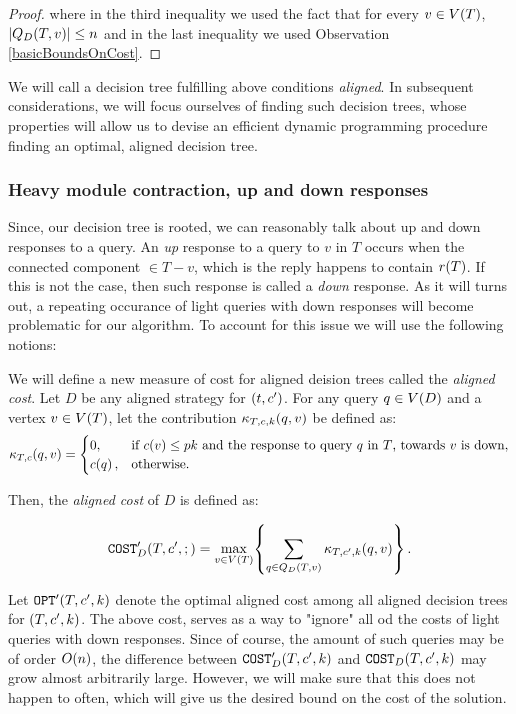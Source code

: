 \begin{lemma}
\begin{proof}
        where in the third inequality we used the fact that for every $v\in V\mathopen{}\left( T \right)$, $\mathopen{}\left| Q_{D}\mathopen{}\left( T,v \right) \right|\leq n$ and in the last inequality we used Observation \ref{basicBoundsOnCost}.
    \end{proof}
\end{lemma}

We will call a decision tree fulfilling above conditions \textit{aligned}. In subsequent considerations, we will focus ourselves of finding such decision trees, whose properties will allow us to devise an efficient dynamic programming procedure finding an optimal, aligned decision tree. 

\subsubsection{Heavy module contraction, up and down responses}
Since, our decision tree is rooted, we can reasonably talk about up and down responses to a query. An \textit{up} response to a query to $v$ in $T$ occurs when the connected component $\in T-v$, which is the reply happens to contain $r\mathopen{}\left( T \right)$. If this is not the case, then such response is called a \textit{down} response. As it will turns out, a repeating occurance of light queries with down responses will become problematic for our algorithm. To account for this issue we will use the following notions:

We will define a new measure of cost for aligned deision trees called the \textit{aligned cost}. Let $D$ be any aligned strategy for $\mathopen{}\left( t,c' \right)$. For any query $q\in V\mathopen{}\left( D \right)$ and a vertex $v\in V\mathopen{}\left( T \right)$, let the contribution $\kappa_{T,c,k}\mathopen{}\left( q,v \right)$ be defined as:
$$
\kappa_{T,c}\mathopen{}\left( q, v \right)= \begin{cases}
    0, & \text{if } c\mathopen{}\left( v \right)\leq pk \text{ and the response to query $q$ in $T$, towards $v$ is down},\\
    c\mathopen{}\left( q \right), & \text{otherwise}.
\end{cases}
$$

Then, the \textit{aligned cost} of $D$ is defined as:

$$
\texttt{COST}'_D\mathopen{}\left( T,c',; \right)=\max_{v\in V\mathopen{}\left( T \right)}\mathopen{}\left\{ \sum_{q\in Q_D\mathopen{}\left( T,v \right)}\kappa_{T,c', k}\mathopen{}\left( q,v \right) \right\}.
$$

Let $\texttt{OPT}'\mathopen{}\left( T,c',k \right)$ denote the optimal aligned cost among all aligned decision trees for $\mathopen{}\left( T,c',k \right)$.
The above cost, serves as a way to "ignore" all od the costs of light queries with down responses. Since of course, the amount of such queries may be of order $O\mathopen{}\left( n \right)$, the difference between $\texttt{COST}'_D\mathopen{}\left( T,c',k \right)$ and $\texttt{COST}_D\mathopen{}\left( T,c',k \right)$ may grow almost arbitrarily large. However, we will make sure that this does not happen to often, which will give us the desired bound on the cost of the solution.

